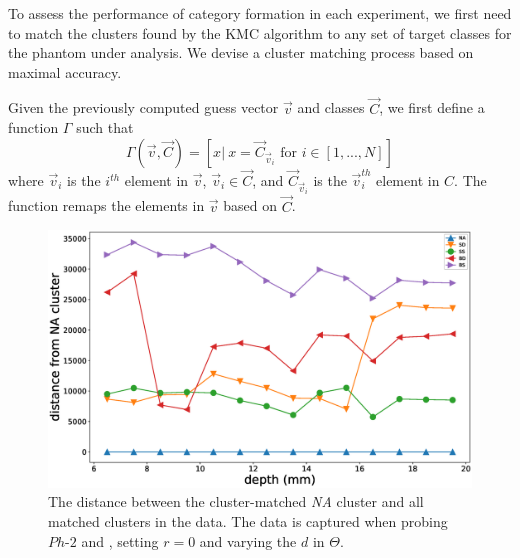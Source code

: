To assess the performance of category formation in each experiment, we first need to match the clusters 
found by the KMC algorithm to any set of target classes for the phantom under analysis. We devise a cluster 
matching process based on maximal accuracy. 

Given the previously computed guess vector $\vec{v}$ and classes $\vec{C}$, 
we first define a function $\Gamma$ such that
\begin{equation}
\Gamma(\vec{v}, \vec{C})=[x |\ x=\vec{C}_{\vec{v}_i} \text{ for } i\in[1,... ,N]] 
\end{equation} 
where $\vec{v}_i$ is the $i^{th}$ element in $\vec{v}$, $\vec{v}_i\in \vec{C}$, and $\vec{C}_{\vec{v}_i}$ is the $\vec{v}_i^{th}$ element in $C$. The function remaps the elements in $\vec{v}$ based on $\vec{C}$.

\begin{figure}[]
	\centering
	\includegraphics[width=\columnwidth]{./figs/phantom2propertiesVertical_na-dist.eps}
	\caption{The distance between the cluster-matched \textit{NA} cluster and all matched clusters in the data. 
		The data is captured when probing $Ph\text{-}2$ and , setting $r=0$ and varying the $d$ in $\Theta$.}
	\label{na_dist}
\end{figure}

